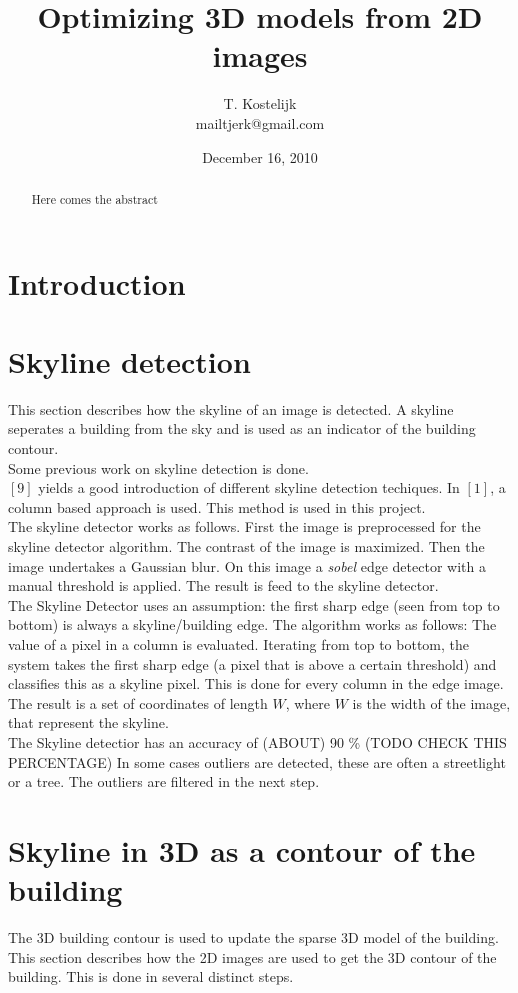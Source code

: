 \documentclass[10pt]{article}
\title{\sc Optimizing 3D models from 2D images}
\author{T. Kostelijk\\mailtjerk@gmail.com}
\date{December 16, 2010}
\begin{document}
\maketitle
\begin{abstract}
Here comes the abstract
\end{abstract}

\section{Introduction}

\section{Skyline detection}
This section describes how the skyline of an image is detected. A skyline
seperates a building from the sky and is used as an indicator of the building contour.
\\
Some previous work on skyline detection is done.\\
$[9]$ yields a good introduction of different skyline detection techiques.
In $[1]$, a column based approach is used. This method is used in this project.
\\
The skyline detector works as follows.
First the image is preprocessed for the skyline detector algorithm.
The contrast of the image is maximized. Then the image undertakes a Gaussian blur.  On this image a
\textit{sobel} edge detector with a manual threshold is applied.
The result is feed to the skyline detector.
\\
The Skyline Detector uses an assumption: the first sharp edge (seen
from top to bottom) is always a skyline/building edge. The algorithm works as
follows: The value of a pixel in a column is evaluated. Iterating from top to
bottom, the system takes the first sharp edge (a pixel that is above a certain
threshold) and classifies this as a skyline pixel.  This is done for every
column in the edge image. The result is a set of coordinates of length $W$,
where $W$ is the width of the image, that represent the skyline.
\\
The Skyline detectior has an accuracy of (ABOUT) 90 \% (TODO CHECK THIS PERCENTAGE) 
In some cases outliers are detected, these are often a streetlight or a tree. The outliers are
filtered in the next step.

\section{Skyline in 3D as a contour of the building}
The 3D building contour is used to update the sparse 3D model of the building.
This section describes how the 2D images are used to get the 3D contour of the
building. This is done in several distinct steps.  
\end{document}
